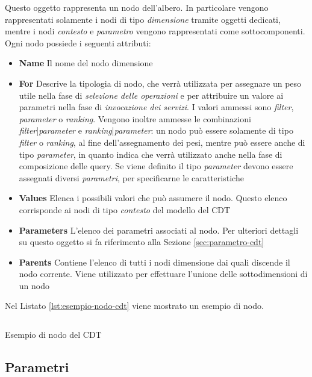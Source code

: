 Questo oggetto rappresenta un nodo dell'albero. In particolare vengono rappresentati solamente i nodi di tipo \emph{dimensione} tramite oggetti dedicati, mentre i nodi \emph{contesto} e \emph{parametro} vengono rappresentati come sottocomponenti. Ogni nodo possiede i seguenti attributi:

\begin{itemize}
	\item \textbf{Name} Il nome del nodo dimensione
	\item \textbf{For} Descrive la tipologia di nodo, che verrà utilizzata per assegnare un peso utile nella fase di \emph{selezione delle operazioni} e per attribuire un valore ai parametri nella fase di \emph{invocazione dei servizi}. I valori ammessi sono \emph{filter}, \emph{parameter} o \emph{ranking}. Vengono inoltre ammesse le combinazioni \emph{filter}|\emph{parameter} e \emph{ranking}|\emph{parameter}: un nodo può essere solamente di tipo \emph{filter} o \emph{ranking}, al fine dell'assegnamento dei pesi, mentre può essere anche di tipo \emph{parameter}, in quanto indica che verrà utilizzato anche nella fase di composizione delle query. Se viene definito il tipo \emph{parameter} devono essere assegnati diversi \emph{parametri}, per specificarne le caratteristiche
	\item \textbf{Values} Elenca i possibili valori che può assumere il nodo. Questo elenco corrisponde ai nodi di tipo \emph{contesto} del modello del CDT
	\item \textbf{Parameters} L'elenco dei parametri associati al nodo. Per ulteriori dettagli su questo oggetto si fa riferimento alla Sezione \ref{sec:parametro-cdt}
	\item \textbf{Parents} Contiene l'elenco di tutti i nodi dimensione dai quali discende il nodo corrente. Viene utilizzato per effettuare l'unione delle sottodimensioni di un nodo
\end{itemize}

Nel Listato \ref{lst:esempio-nodo-cdt} viene mostrato un esempio di nodo.
	
\begin{listing}[H]
	\inputminted{json}{5-implementazione-backend/Codice/esempio_nodo_cdt.json}
	\caption{Esempio di nodo del CDT}
	\label{lst:esempio-nodo-cdt}
\end{listing}

\subsection{Parametri\label{sec:parametro-cdt}}

